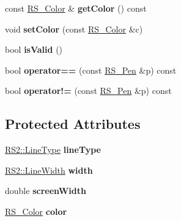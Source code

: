 \begin{DoxyCompactItemize}
\item 
\hypertarget{classRS__Pen_aac31445139e36e2bf3aea062c5d80f0f}{const \hyperlink{classRS__Color}{R\-S\-\_\-\-Color} \& {\bfseries get\-Color} () const }\label{classRS__Pen_aac31445139e36e2bf3aea062c5d80f0f}

\item 
\hypertarget{classRS__Pen_ae54fc1847b7b2f5de84d32152a677679}{void {\bfseries set\-Color} (const \hyperlink{classRS__Color}{R\-S\-\_\-\-Color} \&c)}\label{classRS__Pen_ae54fc1847b7b2f5de84d32152a677679}

\item 
\hypertarget{classRS__Pen_af4034d62099798469b196b409b9d37d3}{bool {\bfseries is\-Valid} ()}\label{classRS__Pen_af4034d62099798469b196b409b9d37d3}

\item 
\hypertarget{classRS__Pen_abe2b1b61d157ca3da68f5cbea94988ea}{bool {\bfseries operator==} (const \hyperlink{classRS__Pen}{R\-S\-\_\-\-Pen} \&p) const }\label{classRS__Pen_abe2b1b61d157ca3da68f5cbea94988ea}

\item 
\hypertarget{classRS__Pen_aebbe1d462b618a163efe4d16c7998261}{bool {\bfseries operator!=} (const \hyperlink{classRS__Pen}{R\-S\-\_\-\-Pen} \&p) const }\label{classRS__Pen_aebbe1d462b618a163efe4d16c7998261}

\end{DoxyCompactItemize}
\subsection*{Protected Attributes}
\begin{DoxyCompactItemize}
\item 
\hypertarget{classRS__Pen_a69545beb2a93c9d20cb679d909d3224b}{\hyperlink{classRS2_a6f3a82972c2d62456f6cacb74e14c95f}{R\-S2\-::\-Line\-Type} {\bfseries line\-Type}}\label{classRS__Pen_a69545beb2a93c9d20cb679d909d3224b}

\item 
\hypertarget{classRS__Pen_a2433e433183b582fe538e6fd2b4588cf}{\hyperlink{classRS2_a023485c482c5ee9e36b3dfad781adf29}{R\-S2\-::\-Line\-Width} {\bfseries width}}\label{classRS__Pen_a2433e433183b582fe538e6fd2b4588cf}

\item 
\hypertarget{classRS__Pen_a137d5080a8cd36268b4fea3fa12c1418}{double {\bfseries screen\-Width}}\label{classRS__Pen_a137d5080a8cd36268b4fea3fa12c1418}

\item 
\hypertarget{classRS__Pen_a4b44b65046fe820fdc3661c2f47660ae}{\hyperlink{classRS__Color}{R\-S\-\_\-\-Color} {\bfseries color}}\label{classRS__Pen_a4b44b65046fe820fdc3661c2f47660ae}

\end{DoxyCompactItemize}
